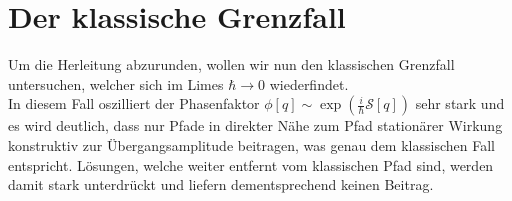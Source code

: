 \section{Der klassische Grenzfall}
Um die Herleitung abzurunden, wollen wir nun den klassischen Grenzfall untersuchen, welcher sich im Limes $\hbar\rightarrow 0$ wiederfindet. \\
In diesem Fall oszilliert der Phasenfaktor $\phi[q] \sim \exp(\frac{i}{\hbar} \mathcal{S}[q])$ sehr stark und es wird deutlich, dass nur Pfade in direkter Nähe zum Pfad stationärer Wirkung konstruktiv zur Übergangsamplitude beitragen, was genau dem klassischen Fall entspricht. Lösungen, welche weiter entfernt vom klassischen Pfad sind, werden damit stark unterdrückt und liefern dementsprechend keinen Beitrag.  